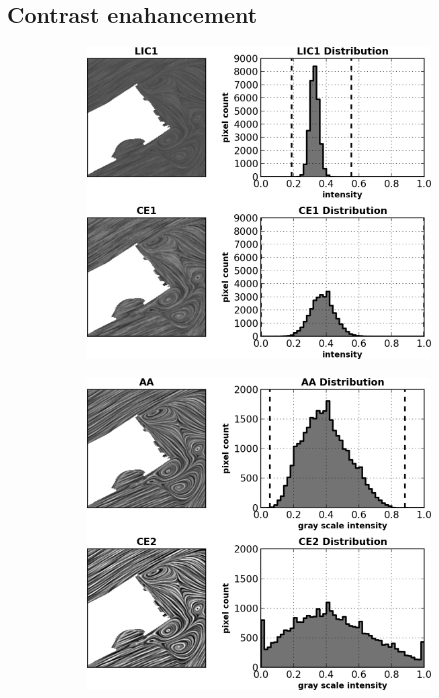 \documentclass[a4paper,10pt]{article}
\begin{document}
\subsection{Contrast enahancement}
\label{sec:contrast}
\begin{figure}[h!]
 \centering
\begin{subfigure}{0.48\textwidth}
\includegraphics[width=\textwidth]{./images-data/dia-serial/gray-ce1-curves.png}
\caption{}
\label{fig:gray-ce-curves1}
\end{subfigure}
\hspace{0.15in}
\begin{subfigure}{0.48\textwidth}
\includegraphics[width=\textwidth]{./images-data/dia-serial/gray-ce2-curves.png}

\end{subfigure}
\end{figure}
\end{document}
